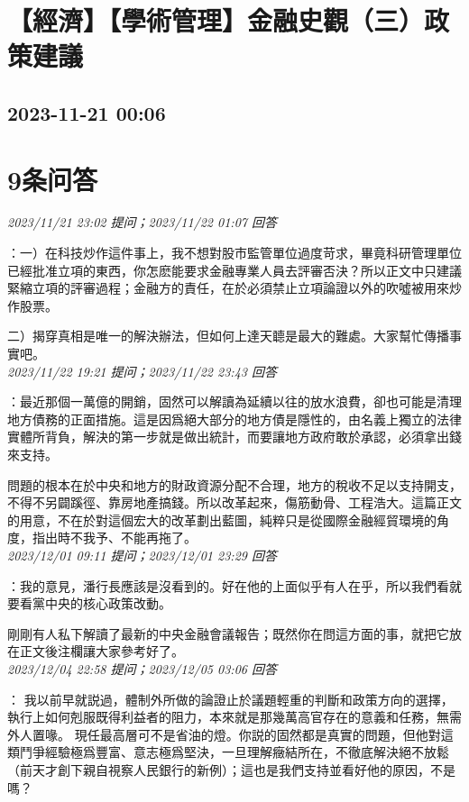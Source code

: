 \documentclass[twocolumn]{ctexart}
\begin{document}
\section{【經濟】【學術管理】金融史觀（三）政策建議}
\subsection{2023-11-21 00:06}


\section{9条问答}

\textit{\hfill\noindent\small 2023/11/21 23:02 提问；2023/11/22 01:07 回答}

：一）在科技炒作這件事上，我不想對股市監管單位過度苛求，畢竟科研管理單位已經批准立項的東西，你怎麽能要求金融專業人員去評審否決？所以正文中只建議緊縮立項的評審過程；金融方的責任，在於必須禁止立項論證以外的吹噓被用來炒作股票。

二）揭穿真相是唯一的解決辦法，但如何上達天聼是最大的難處。大家幫忙傳播事實吧。
\\

\textit{\hfill\noindent\small 2023/11/22 19:21 提问；2023/11/22 23:43 回答}

：最近那個一萬億的開銷，固然可以解讀為延續以往的放水浪費，卻也可能是清理地方債務的正面措施。這是因爲絕大部分的地方債是隱性的，由名義上獨立的法律實體所背負，解決的第一步就是做出統計，而要讓地方政府敢於承認，必須拿出錢來支持。

問題的根本在於中央和地方的財政資源分配不合理，地方的稅收不足以支持開支，不得不另闢蹊徑、靠房地產搞錢。所以改革起來，傷筋動骨、工程浩大。這篇正文的用意，不在於對這個宏大的改革劃出藍圖，純粹只是從國際金融經貿環境的角度，指出時不我予、不能再拖了。
\\

\textit{\hfill\noindent\small 2023/12/01 09:11 提问；2023/12/01 23:29 回答}

：我的意見，潘行長應該是沒看到的。好在他的上面似乎有人在乎，所以我們看就要看黨中央的核心政策改動。

剛剛有人私下解讀了最新的中央金融會議報告；既然你在問這方面的事，就把它放在正文後注欄讓大家參考好了。
\\

\textit{\hfill\noindent\small 2023/12/04 22:58 提问；2023/12/05 03:06 回答}

：
我以前早就説過，體制外所做的論證止於議題輕重的判斷和政策方向的選擇，執行上如何剋服既得利益者的阻力，本來就是那幾萬高官存在的意義和任務，無需外人置喙。
現任最高層可不是省油的燈。你説的固然都是真實的問題，但他對這類鬥爭經驗極爲豐富、意志極爲堅決，一旦理解癥結所在，不徹底解決絕不放鬆（前天才創下親自視察人民銀行的新例）；這也是我們支持並看好他的原因，不是嗎？
\\
\end{document}
